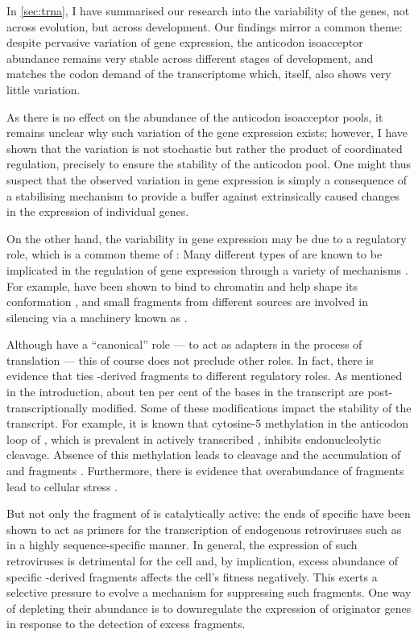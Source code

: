 In \cref{sec:trna}, I have summarised our research into the variability of the
\trna genes, not across evolution, but across development. Our findings mirror a
common theme: despite pervasive variation of \trna gene expression, the
anticodon isoacceptor \trna abundance remains very stable across different
stages of development, and matches the codon demand of the transcriptome which,
itself, also shows very little variation.

As there is no effect on the abundance of the \trna anticodon isoacceptor pools,
it remains unclear why such variation of the \trna gene expression exists;
however, I have shown that the variation is not stochastic but rather the
product of coordinated regulation, precisely to ensure the stability of the
anticodon pool. One might thus suspect that the observed variation in \trna gene
expression is simply a consequence of a stabilising mechanism to provide a
buffer against extrinsically caused changes in the expression of individual
\trna genes.

On the other hand, the variability in \trna gene expression may be due to a
regulatory role, which is a common theme of \ncrna[s]: Many different types of
\ncrna are known to be implicated in the regulation of gene expression through a
variety of mechanisms \citep{Mattick:2006}. For example, \lncrna[s] have been
shown to bind to chromatin and help shape its conformation \citep{Rinn:2012},
and small \rna fragments from different sources are involved in \rna silencing
via a machinery known as \risc \citep{Hamilton:1999,Hammond:2000}.

Although \trna[s] have a “canonical” role — to act as adapters in the process of
translation — this of course does not preclude other roles. In fact, there is
evidence that ties \trna-derived fragments to different regulatory roles. As
mentioned in the introduction, about ten per cent of the bases in the \trna[s]
transcript are post-transcriptionally modified. Some of these modifications
impact the stability of the transcript. For example, it is known that
cytosine-\num{5} methylation in the anticodon loop of \trna[s], which is
prevalent in actively transcribed \trna[s], inhibits endonucleolytic cleavage.
Absence of this methylation leads to cleavage and the accumulation of \threep
and \fivep fragments \citep{Thompson:2008}. Furthermore, there is evidence that
overabundance of \fivep \trna fragments lead to cellular stress
\citep{Blanco:2014}.

But not only the \fivep fragment of \trna[s] is catalytically active: the
\threep ends of specific \trna[s] have been shown to act as primers for the
transcription of endogenous retroviruses such as \hivi \citep{Litvak:1994} in a
highly sequence-specific manner. In general, the expression of such retroviruses
is detrimental for the cell and, by implication, excess abundance of specific
\trna-derived fragments affects the cell’s fitness negatively. This exerts a
selective pressure to evolve a mechanism for suppressing such fragments. One way
of depleting their abundance is to downregulate the expression of originator
\trna genes in response to the detection of excess \trna fragments.

